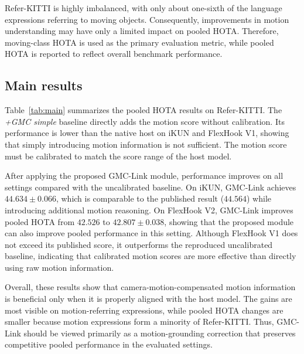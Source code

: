 \documentclass[sigconf,anonymous,nonacm]{acmart}
\begin{document}
Refer-KITTI is highly imbalanced, with only about one-sixth of the language expressions referring to moving objects. Consequently, improvements in motion understanding may have only a limited impact on pooled HOTA. Therefore, moving-class HOTA is used as the primary evaluation metric, while pooled HOTA is reported to reflect overall benchmark performance.

\subsection{Main results}
\label{sec:main}

Table~\ref{tab:main} summarizes the pooled HOTA results on Refer-KITTI. The \emph{+GMC simple} baseline directly adds the motion score without calibration. Its performance is lower than the native host on iKUN and FlexHook V1, showing that simply introducing motion information is not sufficient. The motion score must be calibrated to match the score range of the host model.

After applying the proposed GMC-Link module, performance improves on all settings compared with the uncalibrated baseline. On iKUN, GMC-Link achieves $44.634 \pm 0.066$, which is comparable to the published result ($44.564$) while introducing additional motion reasoning. On FlexHook V2, GMC-Link improves pooled HOTA from $42.526$ to $42.807 \pm 0.038$, showing that the proposed module can also improve pooled performance in this setting. Although FlexHook V1 does not exceed its published score, it outperforms the reproduced uncalibrated baseline, indicating that calibrated motion scores are more effective than directly using raw motion information.

Overall, these results show that camera-motion-compensated motion information is beneficial only when it is properly aligned with the host model. The gains are most visible on motion-referring expressions, while pooled HOTA changes are smaller because motion expressions form a minority of Refer-KITTI. Thus, GMC-Link should be viewed primarily as a motion-grounding correction that preserves competitive pooled performance in the evaluated settings.
\end{document}
